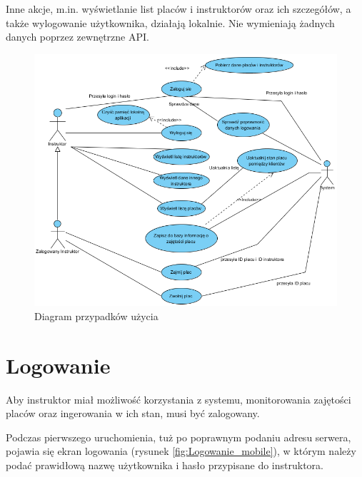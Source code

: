 \documentclass[twoside,a4paper,openright,12pt]{book}
\begin{document}
Inne akcje, m.in. wyświetlanie list placów i instruktorów oraz ich szczegółów, a także wylogowanie użytkownika, działają lokalnie. Nie wymieniają żadnych danych poprzez zewnętrzne API.

\begin{figure}[H]
\centering
\includegraphics[width=1\textwidth]{screenshots/uml/usecases.png}
\caption{Diagram przypadków użycia}
\label{fig:Diagram przypadków użycia}
\end{figure}



\section{Logowanie}
Aby instruktor miał możliwość korzystania z systemu, monitorowania zajętości placów oraz ingerowania w ich stan, musi być zalogowany.

Podczas pierwszego uruchomienia, tuż po poprawnym podaniu adresu serwera, pojawia się ekran logowania (rysunek \ref{fig:Logowanie_mobile}), w którym należy podać prawidłową nazwę użytkownika i hasło przypisane do instruktora.
\end{document}
